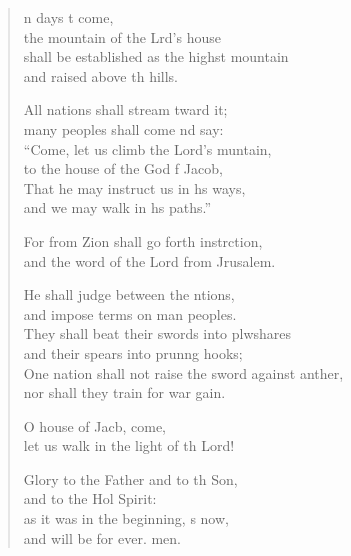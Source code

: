 \begin{verse}
  \begin{patverse}
n days t come,\Med\\
the mountain of the Lrd’s house\\
shall be established as the highst mountain\Med\\
and raised above th hills.

All nations shall stream tward it;\Med\\
many peoples shall come nd say:\\
“Come, let us climb the Lord’s muntain,\Med\\
to the house of the God f Jacob,\\
That he may instruct us in h\pointup{\i}s ways, \Med\\
and we may walk in h\pointup{\i}s paths.”

For from Zion shall go forth instrction,\Med\\
and the word of the Lord from Jrusalem.

He shall judge between the ntions,\Med\\
and impose terms on man peoples.\\
They shall beat their swords into plwshares\Med\\
and their spears into prun\pointup{\i}ng hooks;\\
One nation shall not raise the sword against anther,\Med\\
nor shall they train for war gain.

O house of Jacb, come,\Med\\
let us walk in the light of th Lord!

Glory to the Father and to th Son,\Med\\
    and to the Hol Spirit:\\
as it was in the beginning, \pointup{\i}s now,\Med\\
    and will be for ever. men.
  \end{patverse}
\end{verse}
